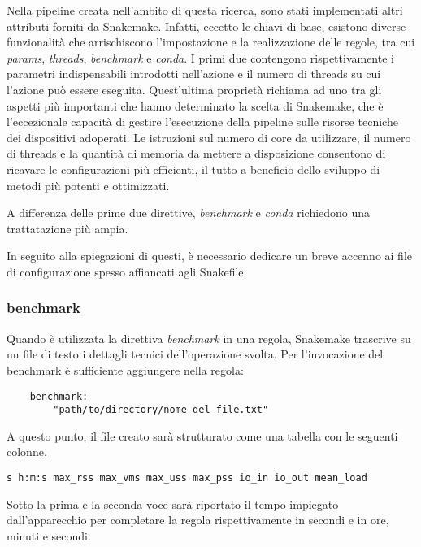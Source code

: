 Nella pipeline creata nell'ambito di questa ricerca, sono stati implementati altri attributi forniti da Snakemake.
Infatti, eccetto le chiavi di base, esistono diverse funzionalità che arrischiscono l'impostazione e la realizzazione delle regole, tra cui \textit{params}, \textit{threads}, \textit{benchmark} e \textit{conda}.
I primi due contengono rispettivamente i parametri indispensabili introdotti nell'azione e il numero di threads su cui l'azione può essere eseguita.
Quest'ultima proprietà richiama ad uno tra gli aspetti più importanti che hanno determinato la scelta di Snakemake, che è  l'eccezionale capacità di gestire l'esecuzione della pipeline sulle risorse tecniche dei dispositivi adoperati.
Le istruzioni sul numero di core da utilizzare, il numero di threads e la quantità di memoria da mettere a disposizione consentono di ricavare le configurazioni più efficienti, il tutto a beneficio dello sviluppo di metodi più potenti e ottimizzati.

A differenza delle prime due direttive, \textit{benchmark} e \textit{conda} richiedono una trattatazione più ampia.

In seguito alla spiegazioni di questi, è necessario dedicare un breve accenno ai file di configurazione spesso affiancati agli Snakefile.

\subsubsection{benchmark}
Quando è utilizzata la direttiva \textit{benchmark} in una regola, Snakemake trascrive su un file di testo i dettagli tecnici dell'operazione svolta.
Per l'invocazione del benchmark è sufficiente aggiungere nella regola:
\begin{lstlisting}
	benchmark:
		"path/to/directory/nome_del_file.txt"
\end{lstlisting}
A questo punto, il file creato sarà strutturato come una tabella con le seguenti colonne.

\begin{lstlisting}
s h:m:s max_rss max_vms max_uss max_pss io_in io_out mean_load
\end{lstlisting}
Sotto la prima e la seconda voce sarà riportato il tempo impiegato dall'apparecchio per completare la regola rispettivamente in secondi e in ore, minuti e secondi.

